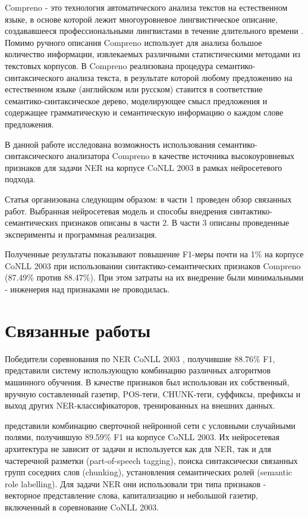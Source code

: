 \documentclass[a4paper,12pt]{article}
\begin{document}
  Compreno -  это технология автоматического анализа текстов на естественном языке,
  в основе которой
  лежит многоуровневое лингвистическое описание, создававшееся профессиональными
  лингвистами в течение длительного времени \citep{anisimovich2012syntactic}.
  Помимо ручного описания Compreno использует для анализа большое количество
  информации, извлекаемых различными статистическими методами из текстовых корпусов.
  В Compreno реализована процедура семантико-синтаксического анализа текста,
  в результате которой любому предложению на естественном языке (английском или русском)
  ставится в соответствие семантико-синтаксическое дерево, моделирующее смысл предложения
  и содержащее грамматическую и семантическую информацию о каждом слове предложения.

  В данной работе исследована возможность использования семантико-синтаксического
  анализатора Compreno в качестве источника высокоуровневых признаков для задачи
  NER на корпусе CoNLL 2003 в рамках нейросетевого подхода.

  Статья организована следующим образом: в части 1 проведен обзор связанных работ.
  Выбранная нейросетевая модель и способы внедрения синтактико-семантических признаков описаны в части 2.
  В части 3 описаны проведенные эксперименты и программная реализация.

  Полученные результаты показывают повышение F1-меры почти на 1\% на корпусе CoNLL 2003
  при использовании синтактико-семантических признаков Compreno (87.49\% против 88.47\%).
  При этом затраты на их внедрение были минимальными - инженерия над признаками не проводилась.

\section{Связанные работы}
  Победители соревнования по NER CoNLL 2003 \citep{florian2003named}, получившие 88.76\% F1,
  представили систему использующую комбинацию различных алгоритмов машинного обучения.
  В качестве признаков был использован их собственный, вручную составленный газетир,
  POS-теги, CHUNK-теги, суффиксы, префиксы и выход других NER-классификаторов,
  тренированных на внешних данных.

  \citep{collobert2011natural} представили комбинацию сверточной нейронной сети
  с условными случайными полями, получившую 89.59\% F1 на корпусе CoNLL 2003.
  Их нейросетевая архитектура не зависит от задачи и используется как для NER, так и для
  частеречной разметки (part-of-speech tagging), поиска синтаксически связанных групп
  соседних слов (chunking), установления семантических ролей (semantic role labelling).
  Для задачи NER они использовали три типа признаков - векторное представление слова,
  капитализацию и небольшой газетир, включенный в соревнование CoNLL 2003.
\end{document}
